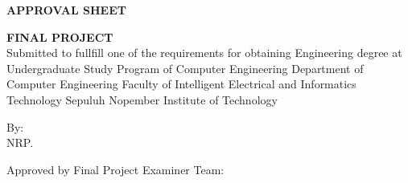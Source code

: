 \begin{center}
  \large
  \textbf{APPROVAL SHEET}
\end{center}

\thispagestyle{empty}

\begin{center}
  \textbf{\engtatitle{}}
\end{center}

\begingroup
\small

\begin{center}
  \textbf{FINAL PROJECT}
  \\Submitted to fullfill one of the requirements for obtaining Engineering degree at Undergraduate Study Program of Computer Engineering Department of Computer Engineering Faculty of Intelligent Electrical and Informatics Technology Sepuluh Nopember Institute of Technology
\end{center}

\begin{center}
  By: \name{}
  \\NRP. \nrp{}
\end{center}

\begin{center}
  Approved by Final Project Examiner Team:
\end{center}

\begingroup
\setlength{\tabcolsep}{0pt}


